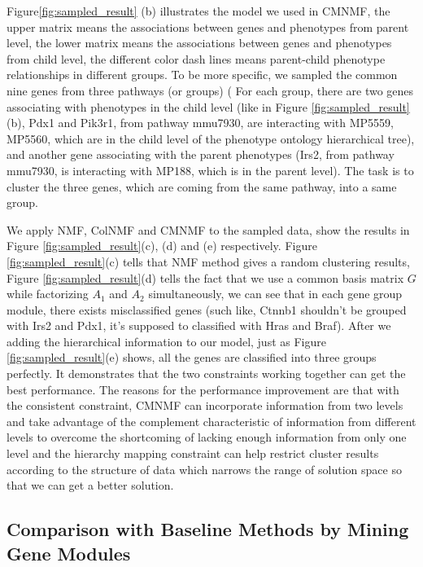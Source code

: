 \documentclass{bmcart}
\begin{document}
Figure\ref{fig:sampled_result} (b) illustrates the model we used in CMNMF, the upper matrix means the associations between genes and phenotypes from parent level, the lower matrix means the associations between genes and phenotypes from child level, the different color dash lines means parent-child phenotype relationships in different groups.
To be more specific, we sampled the common nine genes from three pathways (or groups) ( For each group, there are two genes associating with phenotypes in the child level (like in Figure \ref{fig:sampled_result}(b), Pdx1 and Pik3r1, from pathway mmu7930, are interacting with MP5559, MP5560, which are in the child level of the phenotype ontology hierarchical tree), and another gene associating with the parent phenotypes (Irs2, from pathway mmu7930, is interacting with MP188, which is in the parent level). The task is to cluster the three genes, which are coming from the same pathway, into a same group.

We apply NMF, ColNMF and CMNMF to the sampled data, show the results in Figure \ref{fig:sampled_result}(c), (d) and (e) respectively. Figure \ref{fig:sampled_result}(c) tells that NMF method gives a random clustering results, Figure \ref{fig:sampled_result}(d) tells the fact that we use a common basis matrix $G$ while factorizing $A_1$ and $A_2$ simultaneously, we can see that in each gene group module, there exists misclassified genes (such like, Ctnnb1 shouldn't be grouped with Irs2 and Pdx1, it's supposed to classified with Hras and Braf). After we adding the hierarchical information to our model, just as Figure \ref{fig:sampled_result}(e) shows, all the genes are classified into three groups perfectly. It demonstrates that the two constraints working together can get the best performance. The reasons for the performance improvement are that with the consistent constraint, CMNMF can incorporate information from two levels and take advantage of the complement characteristic of information from different levels to overcome the shortcoming of lacking enough information from only one level and the hierarchy mapping constraint can help restrict cluster results according to the structure of data which narrows the range of solution space so that we can get a better solution.

\subsection*{\textbf{Comparison with Baseline Methods by Mining Gene Modules}}
\end{document}
